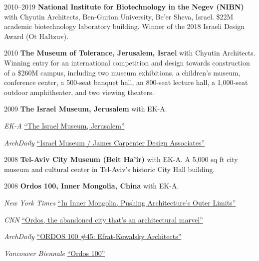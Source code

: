 \begin{tablist}

    \item[2010--2019] \tab \textbf{National Institute for Biotechnology in the Negev (NIBN)} with Chyutin Architects, Ben-Gurion University, Be'er Sheva, Israel. \$22M academic biotechnology laboratory building. Winner of the 2018 Israeli Design Award (Ot HaItzuv).

    \item[2010] \tab \textbf{The Museum of Tolerance, Jerusalem, Israel} with Chyutin Architects. Winning entry for an international competition and design towards construction of a \$260M campus, including two museum exhibitions, a children's museum, conference center, a 500-seat banquet hall, an 800-seat lecture hall, a 1,000-seat outdoor amphitheater, and two viewing theaters.

    \item[2009] \tab \textbf{The Israel Museum, Jerusalem} with EK-A.
    \begin{tablist}
        \item[\textit{EK-A}] \href{https://www.efrat-kowalsky.co.il/projects-repeater/the-israel-museum%2C-jerusalem}{\enquote{The Israel Museum, Jerusalem}}
        \item[\textit{ArchDaily}] \href{https://www.archdaily.com/373684/israel-museum-james-carpenter-design-associates}{\enquote{Israel Museum / James Carpenter Design Associates}}
    \end{tablist}

    \item[2008] \tab \textbf{Tel-Aviv City Museum (Beit Ha'ir)} with EK-A. A 5,000 sq ft city museum and cultural center in Tel-Aviv's historic City Hall building.

    \item[2008] \tab \textbf{Ordos 100, Inner Mongolia, China} with EK-A.
    \begin{tablist}
        \item[\textit{New York Times}] \href{https://www.nytimes.com/2008/05/01/garden/01mongolia.html}{\enquote{In Inner Mongolia, Pushing Architecture's Outer Limits}}
        \item[\textit{CNN}] \href{https://www.cnn.com/style/article/china-ordos-ghost-town/index.html}{\enquote{Ordos, the abandoned city that's an architectural marvel}}
        \item[\textit{ArchDaily}] \href{https://www.archdaily.com/32535/ordos-100-45-efrat-kowalsky-architects}{\enquote{ORDOS 100 \#45: Efrat-Kowalsky Architects}}
        \item[\textit{Vancouver Biennale}] \href{https://vimeo.com/136530514}{\enquote{Ordos 100}}
    \end{tablist}

\end{tablist}
